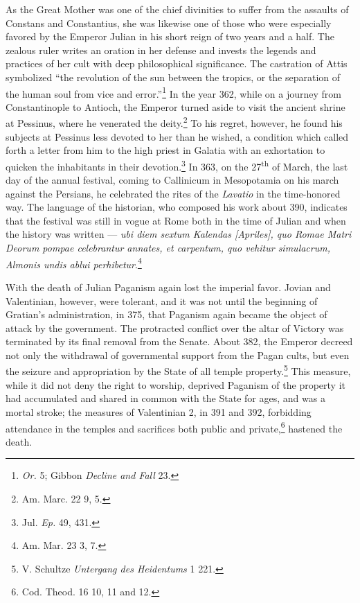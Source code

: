 \documentclass[a4paper, 11pt, oneside, polutonikogreek, english]{article}
\begin{document}
As the Great Mother was one of the chief divinities to suffer from the assaults of Constans and Constantius, she was likewise one of those who were especially favored by the Emperor Julian in his short reign of two years and a half. The zealous ruler writes an oration in her defense and invests the legends and practices of her cult with deep philosophical significance. The castration of Attis symbolized ``the revolution of the sun between the tropics, or the separation of the human soul from vice and error.''\footnote{\emph{Or.} 5; Gibbon \emph{Decline and Fall} 23.} In the year 362, while on a journey from Constantinople to Antioch, the Emperor turned aside to visit the ancient shrine at Pessinus, where he venerated the deity.\footnote{Am. Marc. 22 9, 5.} To his regret, however, he found his subjects at Pessinus less devoted to her than he wished, a condition which called forth a letter from him to the high priest in Galatia with an exhortation to quicken the inhabitants in their devotion.\footnote{Jul. \emph{Ep.} 49, 431.} In 363, on the 27\textsuperscript{th} of March, the last day of the annual festival, coming to Callinicum in Mesopotamia on his march against the Persians, he celebrated the rites of the \emph{Lavatio} in the time-honored way. The language of the historian, who composed his work about 390, indicates that the festival was still in vogue at Rome both in the time of Julian and when the history was written --- \emph{ubi diem sextum Kalendas [Apriles], quo Romae Matri Deorum pompae celebrantur annates, et carpentum, quo vehitur simulacrum, Almonis undis ablui perhibetur}.\footnote{Am. Mar. 23 3, 7.}

With the death of Julian Paganism again lost the imperial favor. Jovian and Valentinian, however, were tolerant, and it was not until the beginning of Gratian's administration, in 375, that Paganism again became the object of attack by the government. The protracted conflict over the altar of Victory was terminated by its final removal from the Senate. About 382, the Emperor decreed not only the withdrawal of governmental support from the Pagan cults, but even the seizure and appropriation by the State of all temple property.\footnote{V. Schultze \emph{Untergang des Heidentums} 1 221.} This measure, while it did not deny the right to worship, deprived Paganism of the property it had accumulated and shared in common with the State for ages, and was a mortal stroke; the measures of Valentinian 2, in 391 and 392, forbidding attendance in the temples and sacrifices both public and private,\footnote{Cod. Theod. 16 10, 11 and 12.} hastened the death.
\end{document}
